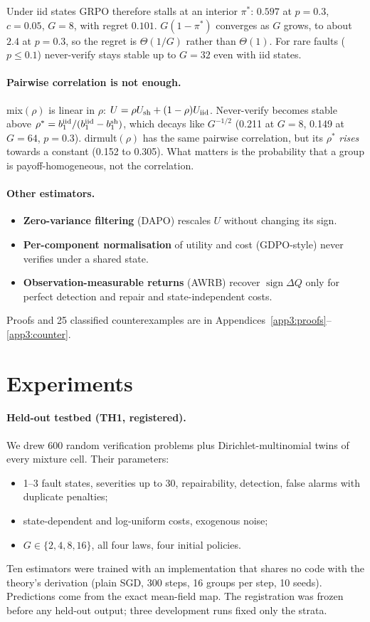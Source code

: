 \documentclass[11pt]{article}
\newcommand{\sgn}{\operatorname{sign}}
\begin{document}
Under iid states GRPO therefore stalls at an interior $\pi^\ast$: $0.597$ at $p=0.3$, $c=0.05$, $G=8$, with regret
$0.101$. $G(1-\pi^\ast)$ converges as $G$ grows, to about $2.4$ at $p=0.3$, so the regret is $\Theta(1/G)$ rather than
$\Theta(1)$. For rare faults ($p\le0.1$) never-verify stays stable up to $G=32$ even with iid states.

\paragraph{Pairwise correlation is not enough.} mix$(\rho)$ is linear in $\rho$:
$U=\rho U_{\rm sh}+(1-\rho)U_{\rm iid}$. Never-verify becomes stable above
$\rho^\ast=b_1^{\rm iid}/(b_1^{\rm iid}-b_1^{\rm sh})$, which decays like $G^{-1/2}$ (0.211 at $G=8$, 0.149 at $G=64$,
$p=0.3$). dirmult$(\rho)$ has the same pairwise correlation, but its $\rho^\ast$ \emph{rises} towards a constant
(0.152 to 0.305). What matters is the probability that a group is payoff-homogeneous, not the correlation.

\paragraph{Other estimators.}
\begin{itemize}
\item \textbf{Zero-variance filtering} (DAPO) rescales $U$ without changing its sign.
\item \textbf{Per-component normalisation} of utility and cost (GDPO-style) never verifies under a shared state.
\item \textbf{Observation-measurable returns} (AWRB) recover $\sgn\Delta Q$ only for perfect detection and repair
and state-independent costs.
\end{itemize}
Proofs and 25 classified counterexamples are in Appendices~\ref{app3:proofs}--\ref{app3:counter}.

\section{Experiments}\label{sec:exp3}
\paragraph{Held-out testbed (TH1, registered).} We drew 600 random verification problems plus Dirichlet-multinomial
twins of every mixture cell. Their parameters:
\begin{itemize}
\item 1--3 fault states, severities up to 30, repairability, detection, false alarms with duplicate penalties;
\item state-dependent and log-uniform costs, exogenous noise;
\item $G\in\{2,4,8,16\}$, all four laws, four initial policies.
\end{itemize}
Ten estimators were trained with an implementation that shares no code with the theory's derivation (plain SGD, 300
steps, 16 groups per step, 10 seeds). Predictions come from the exact mean-field map. The registration was frozen
before any held-out output; three development runs fixed only the strata.
\end{document}
